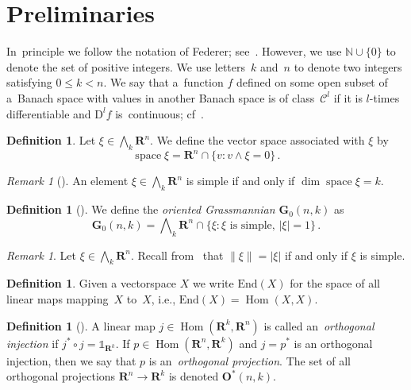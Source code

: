 \documentclass[a4paper,twoside,reqno]{article}
\theoremstyle{definition}
\theoremstyle{remark}
\theoremstyle{plain}
\theoremstyle{remark}
\newtheorem{remark}[theorem]{Remark}
\theoremstyle{definition}
\newtheorem{definition}[theorem]{Definition}
\newcommand{\End}[1]{ \mathrm{End}({#1}) }
\newcommand{\ograss}[2]{\mathbf{G}_0(#1,#2)}
\newcommand{\natp}{\mathbb{N}}
\newcommand{\nat}{\natp \cup \{0\}}
\newcommand{\R}{\mathbf{R}}
\newcommand{\uD}{\ensuremath{\mathrm{D}}}
\newcommand{\id}[1]{\mathds{1}_{#1}}
\newcommand{\tbwedge}{{\textstyle \boldsymbol{\bigwedge}}}
\DeclareMathOperator{\Hom}{Hom}
\DeclareMathOperator{\asssp}{space}
\newcommand{\cnt}[1]{\mathscr{C}^{#1}}
\newcommand{\orthproj}[2]{\mathbf{O}^\ast({#1},{#2})}
\begin{document}
\section{Preliminaries}\label{section:Preliminaries}

In~principle we follow the notation of Federer;
see~\cite[pp.~669--671]{Federer1969}. However, we use $\nat$ to denote the set
of positive integers. We use letters~$k$ and~$n$ to denote two integers
satisfying $0 \le k < n$. We say that a~function $f$ defined on some open subset
of a~Banach space with values in another Banach space is of class~$\cnt{l}$ if
it is $l$-times differentiable and $\uD^l f$ is~continuous;
cf~\cite[3.1.11]{Federer1969}.

\begin{definition}
    Let $\xi \in \tbwedge_k \R^n$. We define the vector space associated with
    $\xi$ by
    \begin{displaymath}
        \asssp \xi = \R^n \cap \bigl\{ v : v \wedge \xi = 0 \bigr\} \,.
    \end{displaymath}
\end{definition}

\begin{remark}[]
    An element $\xi \in \tbwedge_k \R^n$ is simple if and only if
    $\dim \asssp \xi = k$.
\end{remark}

\begin{definition}[]
    We define the \emph{oriented Grassmannian $\ograss{n}{k}$} as
    \[
        \ograss{n}{k} = \tbwedge_k \R^n \cap \bigl\{ \xi : \xi \text{ is simple}
        ,\, |\xi| = 1 \bigr\} \,.
    \]
\end{definition}

\begin{remark}
    Let $\xi \in \tbwedge_k \R^n$. Recall from~\cite[1.8.1]{Federer1969} that
    $\|\xi\| = |\xi|$ if and only if $\xi$ is simple.
\end{remark}

\begin{definition}
    Given a vectorspace $X$ we write $\End{X}$ for the space of all linear maps
    mapping~$X$ to~$X$, i.e., $\End{X} = \Hom(X,X)$.
\end{definition}

\begin{definition}[]
    A linear map $j \in \Hom(\R^k,\R^n)$ is called an~\emph{orthogonal
    injection} if $j^* \circ j = \id{\R^k}$. If $p \in \Hom(\R^n,\R^k)$ and
    $j = p^*$ is an orthogonal injection, then we say that $p$ is
    an~\emph{orthogonal projection}. The set of all orthogonal projections
    $\R^n \to \R^k$ is denoted $\orthproj nk$.
\end{definition}
\end{document}
